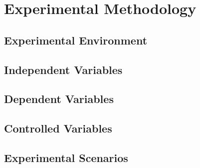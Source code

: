 \chapter{Experimental Methodology}
\label{chap:experimental_methodology}

\section{Experimental Environment}
\label{sec:experimental_environment}

\section{Independent Variables}
\label{sec:independent_variables}

\section{Dependent Variables}
\label{sec:dependent_variables}

\section{Controlled Variables}
\label{sec:controlled_variables}

\section{Experimental Scenarios}
\label{sec:experimental_scenarios}


